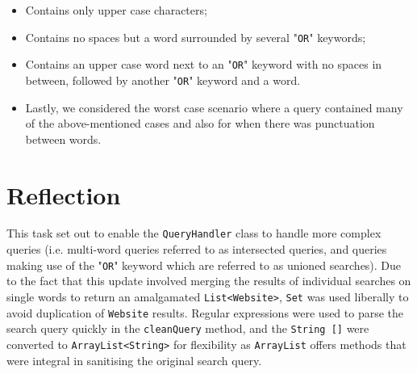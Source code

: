 \begin{itemize}
\begin{itemize}
        \item Contains only upper case characters;
        \item Contains no spaces but a word surrounded by several "{\tt OR}" keywords;
        \item Contains an upper case word next to an "{\tt OR}" keyword with no spaces in between, followed by another "{\tt OR}" keyword and a word.
        \item Lastly, we considered the worst case scenario where a query contained many of the above-mentioned cases and also for when there was punctuation between words.
    \end{itemize}
\end{itemize}

\section{Reflection} %
This task set out to enable the {\tt QueryHandler} class to handle more complex queries (i.e. multi-word queries referred to as intersected queries, and queries making use of the "{\tt OR}" keyword which are referred to as unioned searches).
Due to the fact that this update involved merging the results of individual searches on single words to return an amalgamated {\tt List<Website>}, {\tt Set} was used liberally to avoid duplication of {\tt Website} results.
Regular expressions were used to parse the search query quickly in the {\tt cleanQuery} method, and the {\tt String []} were converted to {\tt ArrayList<String>} for flexibility as {\tt ArrayList} offers methods that were integral in sanitising the original search query.